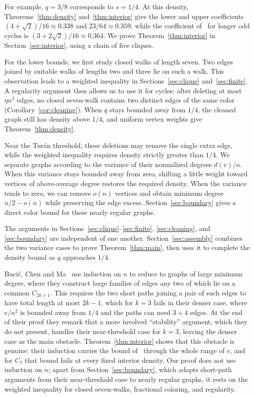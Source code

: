 \documentclass[10pt]{article}
\theoremstyle{remark}
\begin{document}
For example, $q=3/8$ corresponds to $s=1/4$. At this density, Theorems~\ref{thm:density} and~\ref{thm:interior} give the lower and upper coefficients $(4+\sqrt2)/16\approx0.338$ and $23/64\approx0.359$, while the coefficient of~\cite{BCM} for longer odd cycles is $(3+2\sqrt2)/16\approx0.364$. We prove Theorem~\ref{thm:interior} in Section~\ref{sec:interior}, using a chain of five cliques.

For the lower bounds, we first study closed walks of length seven. Two edges joined by suitable walks of lengths two and three lie on such a walk. This observation leads to a weighted inequality in Sections~\ref{sec:clique} and~\ref{sec:finite}. A regularity argument then allows us to use it for cycles: after deleting at most $\eta n^2$ edges, no closed seven-walk contains two distinct edges of the same color (Corollary~\ref{cor:cleaning}). When $q$ stays bounded away from $1/4$, the cleaned graph still has density above $1/4$, and uniform vertex weights give Theorem~\ref{thm:density}.

Near the Tur\'{a}n threshold, these deletions may remove the single extra edge, while the weighted inequality requires density strictly greater than $1/4$. We separate graphs according to the variance of their normalized degrees $d(v)/n$. When this variance stays bounded away from zero, shifting a little weight toward vertices of above-average degree restores the required density. When the variance tends to zero, we can remove $o(n)$ vertices and obtain minimum degree $n/2-o(n)$ while preserving the edge excess. Section~\ref{sec:boundary} gives a direct color bound for these nearly regular graphs.

The arguments in Sections~\ref{sec:clique}--\ref{sec:finite}, \ref{sec:cleaning}, and \ref{sec:boundary} are independent of one another. Section~\ref{sec:assembly} combines the two variance cases to prove Theorem~\ref{thm:main}, then uses it to complete the density bound as $q$ approaches $1/4$.

Buci\'{c}, Chen and Ma~\cite[Sections~2 and~4]{BCM} use induction on $n$ to reduce to graphs of large minimum degree, where they construct large families of edges any two of which lie on a common $C_{2k+1}$. This requires the two short paths joining a pair of such edges to have total length at most $2k-1$, which for $k=3$ fails in their denser case, where $e/n^2$ is bounded away from $1/4$ and the paths can need $3+4$ edges. At the end of their proof they remark that a more involved ``stability'' argument, which they do not present, handles their near-threshold case for $k=3$, leaving the denser case as the main obstacle. Theorem~\ref{thm:interior} shows that this obstacle is genuine: their induction carries the bound of~\cite[Theorem~1.2]{BCM} through the whole range of $e$, and for $C_7$ that bound fails at every fixed interior density. Our proof does not use induction on $n$; apart from Section~\ref{sec:boundary}, which adapts short-path arguments from their near-threshold case to nearly regular graphs, it rests on the weighted inequality for closed seven-walks, fractional coloring, and regularity.
\end{document}
